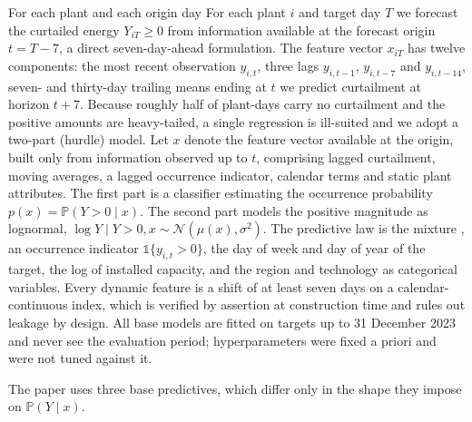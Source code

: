 \documentclass[preprint,3p,times]{elsarticle}
\providecommand{\DIFaddtex}[1]{{\protect\color{blue} \sf #1}} %
\providecommand{\DIFdeltex}[1]{{\protect\color{red} \scriptsize #1}} %
\providecommand{\DIFaddbegin}{} %
\providecommand{\DIFaddend}{} %
\providecommand{\DIFdelbegin}{} %
\providecommand{\DIFdelend}{} %
\providecommand{\DIFadd}[1]{\texorpdfstring{\DIFaddtex{#1}}{#1}} %
\providecommand{\DIFdel}[1]{\texorpdfstring{\DIFdeltex{#1}}{}} %
\begin{document}
\DIFdelbegin \DIFdel{For each plant and each origin day }\DIFdelend \DIFaddbegin \DIFadd{For each plant $i$ and target day $T$ we forecast the curtailed energy $Y_{iT}\ge 0$ from information available at the forecast origin $t=T-7$, a direct seven-day-ahead formulation. The feature vector $x_{iT}$ has twelve components: the most recent observation $y_{i,t}$, three lags $y_{i,t-1}$, $y_{i,t-7}$ and $y_{i,t-14}$, seven- and thirty-day trailing means ending at }\DIFaddend $t$\DIFdelbegin \DIFdel{we predict curtailment at horizon $t+7$. Because roughly half of plant-days carry no curtailment and the positive amounts are heavy-tailed, a single regression is ill-suited and we adopt a two-part (hurdle) model. Let $x$ denote the feature vector available at the origin, built only from information observed up to $t$, comprising lagged curtailment, moving averages, a lagged occurrence indicator, calendar terms and static plant attributes.
The first part is a classifier estimating the occurrence probability $p(x)=\mathbb{P}(Y>0\mid x)$. The second part models the positive magnitude as lognormal, $\log Y \mid Y>0, x \sim \mathcal{N}(\mu(x),\sigma^2)$. The predictive law is the mixture
}\DIFdelend \DIFaddbegin \DIFadd{, an occurrence indicator $\mathbb{1}\{y_{i,t}>0\}$, the day of week and day of year of the target, the log of installed capacity, and the region and technology as categorical variables. Every dynamic feature is a shift of at least seven days on a calendar-continuous index, which is verified by assertion at construction time and rules out leakage by design. All base models are fitted on targets up to 31 December 2023 and never see the evaluation period; hyperparameters were fixed a priori and were not tuned against it.
}

\DIFadd{The paper uses three base predictives, which differ only in the shape they impose on $\mathbb{P}(Y\mid x)$.
}
\end{document}
